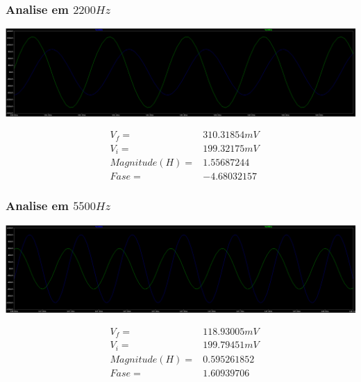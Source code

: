\documentclass[12pt,twoside, a4paper, twocolumn]{article}
\begin{document}
\subsubsection{Analise em $2200Hz$}

\begin{adjustbox}{scale=0.09}
    \includegraphics{ltfreq2200.png}
\end{adjustbox}

\begin{equation*}
    \begin{aligned}
         & V_f =          & 310.31854mV \\
         & V_i =          & 199.32175mV \\
         & Magnitude(H) = & 1.55687244  \\
         & Fase =         & -4.68032157
    \end{aligned}
\end{equation*}

\subsubsection{Analise em $5500Hz$}

\begin{adjustbox}{scale=0.09}
    \includegraphics{ltfreq5500.png}
\end{adjustbox}

\begin{equation*}
    \begin{aligned}
         & V_f =          & 118.93005mV \\
         & V_i =          & 199.79451mV \\
         & Magnitude(H) = & 0.595261852 \\
         & Fase =         & 1.60939706
    \end{aligned}
\end{equation*}
\end{document}
